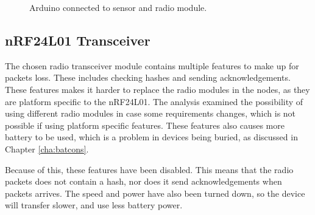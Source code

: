 \begin{figure}[!h]
	\centering
	\caption{Arduino connected to sensor and radio module.}
	\label{fig:compsketch}
\end{figure}

\subsection{nRF24L01 Transceiver}
The chosen radio transceiver module contains multiple features to make up for packets loss. These includes checking hashes and sending acknowledgements\cite{nf24datasheet}.
These features makes it harder to replace the radio modules in the nodes, as they are platform specific to the nRF24L01. The analysis examined the possibility of using different radio modules in case some requirements changes, which is not possible if using platform specific features. These features also causes more battery to be used, which is a problem in devices being buried, as discussed in Chapter \ref{cha:batcons}.

Because of this, these features have been disabled. This means that the radio packets does not contain a hash, nor does it send acknowledgements when packets arrives. The speed and power have also been turned down, so the device will transfer slower, and use less battery power.
